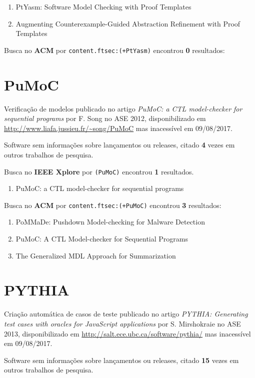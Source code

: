 \begin{enumerate}
\item PtYasm: Software Model Checking with Proof Templates
\item Augmenting Counterexample-Guided Abstraction Refinement with Proof Templates
\end{enumerate}

Busca no {\bf ACM} por
\texttt{content.ftsec:(+PtYasm)}
encontrou {\bf 0}
resultados:


\section{PuMoC}

Verificação de modelos
publicado no artigo {\it PuMoC: a CTL model-checker for sequential programs}
por F. Song
no ASE 2012,
disponibilizado em \url{http://www.liafa.jussieu.fr/~song/PuMoC}
mas inacessível em 09/08/2017.

Software sem informações sobre lançamentos ou releases,
citado {\bf 4} vezes em outros trabalhos de pesquisa.

Busca no {\bf IEEE Xplore} por
\texttt{(PuMoC)}
encontrou {\bf 1}
resultados.

\begin{enumerate}
\item PuMoC: a CTL model-checker for sequential programs
\end{enumerate}

Busca no {\bf ACM} por
\texttt{content.ftsec:(+PuMoC)}
encontrou {\bf 3}
resultados:

\begin{enumerate}
\item PoMMaDe: Pushdown Model-checking for Malware Detection
\item PuMoC: A CTL Model-checker for Sequential Programs
\item The Generalized MDL Approach for Summarization
\end{enumerate}

\section{PYTHIA}

Criação automática de casos de teste
publicado no artigo {\it PYTHIA: Generating test cases with oracles for JavaScript applications}
por S. Mirshokraie
no ASE 2013,
disponibilizado em \url{http://salt.ece.ubc.ca/software/pythia/}
mas inacessível em 09/08/2017.

Software sem informações sobre lançamentos ou releases,
citado {\bf 15} vezes em outros trabalhos de pesquisa.

